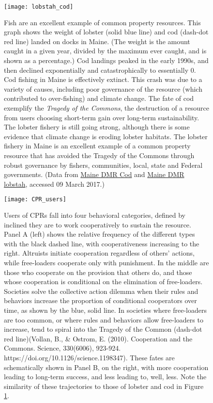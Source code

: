 \newpage
\begin{figure}[p]
\centering
  \texttt{[image: lobstah\_cod]}%


\caption{Fish are an excellent example of common property resources. This graph shows the weight of lobster (solid blue line) and cod (dash-dot red line) landed on docks in Maine. (The weight is the amount caught in a given year, divided by the maximum ever caught, and is shown as a percentage.) Cod landings peaked in the early 1990s, and then declined exponentially and catastrophically to essentially 0. Cod fishing in Maine is effectively extinct. This crash was due to a variety of causes, including poor governance of the resource (which contributed to over-fishing) and climate change. The fate of cod exemplify the \emph{Tragedy of the Commons}, the destruction of a resource from users choosing short-term gain over long-term sustainability. The lobster fishery is still going strong, although there is some evidence that climate change is eroding lobster habitats. The lobster fishery in Maine is an excellent example of a common property resource that has avoided the Tragedy of the Commons through robust governance by fishers, communities, local, state and Federal governments. (Data from \href{http://www.maine.gov/dmr/commercial-fishing/landings/documents/cod.table.pdf}{Maine DMR Cod} and  
\href{http://www.maine.gov/dmr/commercial-fishing/landings/documents/lobster.table.pdf}{Maine DMR lobstah},  accessed 09 March 2017.)}
\label{fig:cod_lobstah}
\end{figure}


\newpage
\begin{figure}[p]
\centering
  \texttt{[image: CPR\_users]}%


\caption{Users of CPRs fall into four behavioral categories, defined by inclined they are to work cooperatively to sustain the resource. Panel A (left) shows the relative frequency of the different types with the black dashed line, with cooperativeness increasing to the right. Altruists initiate cooperation regardless of others' actions, while free-loaders cooperate only with punishment. In the middle are those who cooperate on the provision that others do, and those whose cooperation is conditional on the elimination of free-loaders. Societies solve the collective action dilemma when their rules and behaviors increase the proportion of conditional cooperators over time, as shown by the blue, solid line. In societies where free-loaders are too common, or where rules and behaviors allow free-loaders to increase, tend to spiral into the Tragedy of the Common (dash-dot red line)(Vollan, B., \& Ostrom, E. (2010). Cooperation and  the Commons. Science, 330(6006), 923-924. https://doi.org/10.1126/science.1198347). These fates are schematically shown in Panel B, on the right, with more cooperation leading to long-term success, and less leading to, well, less. Note the similarity of these trajectories to those of lobster and cod in Figure \ref{fig:cod_lobstah}.} 
\label{fig:CPR_users}
\end{figure}


